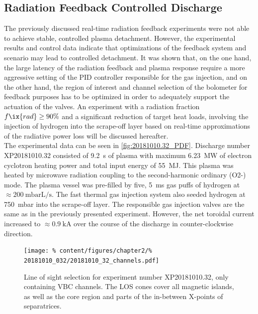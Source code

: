         \subsection{Radiation Feedback Controlled Discharge}\label{subsec:primew7xfeedback}%
%
            The previously discussed real-time radiation feedback experiments were not able to achieve stable, controlled plasma detachment. However, the experimental results and control data indicate that optimizations of the feedback system and scenario may lead to controlled detachment. It was shown that, on the one hand, the large latency of the radiation feedback and plasma response require a more aggressive setting of the PID controller responsible for the gas injection, and on the other hand, the region of interest and channel selection of the bolometer for feedback purposes has to be optimized in order to adequately support the actuation of the valves. An experiment with a radiation fraction $f\ix{rad}\ge90\%$ and a significant reduction of target heat loads, involving the injection of hydrogen into the scrape-off layer based on real-time approximations of the radiative power loss will be discussed hereafter.\\%
            The experimental data can be seen in \cref{fig:20181010.32_PDF}. Discharge number XP20181010.32 consisted of \SI{9.2}{\second} of plasma with maximum \SI{6.23}{\mega\watt} of electron cyclotron heating power and total input energy of \SI{55}{\mega\joule}. This plasma was heated by microwave radiation coupling to the second-harmonic ordinary (O2-) mode. The plasma vessel was pre-filled by five, \SI{5}{\milli\second} gas puffs of hydrogen at $\approx\SI{200}{\milli\bar\liter\per\second}$. The fast thermal gas injection system also seeded hydrogen at \SI{750}{\milli\bar} into the scrape-off layer. The responsible gas injection valves are the same as in the previously presented experiment. However, the net toroidal current increased to $\approx\SI{0.9}{\kilo\ampere}$ over the course of the discharge in counter-clockwise direction.\\%
%
            \begin{figure}[t]%
                \centering%
                \captionsetup{width=.45\textwidth}%
                \begin{minipage}[c]{0.45\textwidth}%
                    \caption{Line of sight selection for experiment number XP20181010.32, only containing VBC channels. The LOS cones cover all magnetic islands, as well as the core region and parts of the in-between X-points of separatrices.}\label{fig:20181010.32_channels}%
                \end{minipage}%
                \hfill%
                \begin{minipage}[c]{0.5\textwidth}%
                    \texttt{[image: \%
                        content/figures/chapter2/\%
                        20181010\_032/20181010\_32\_channels.pdf]}%
                \end{minipage}%
            \end{figure}%
